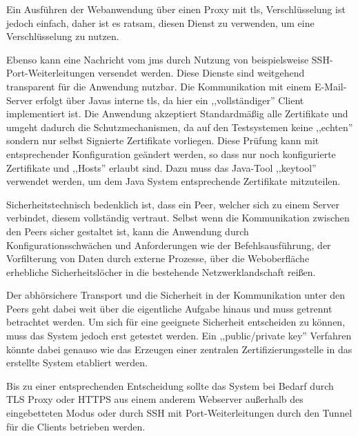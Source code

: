 \documentclass[oneside, ngerman, toc=bibliography,bibliography=totoc,listof=entryprefix, open=right,numbers=noenddot,fontsize=12pt]{scrbook}
\begin{document}
Ein Ausführen der Webanwendung über einen Proxy mit \acrfull{tls}, Verschlüsselung ist jedoch einfach, daher ist es ratsam, diesen Dienst zu verwenden, um eine Verschlüsselung zu nutzen.

Ebenso kann eine Nachricht vom \acrshort{jms} durch Nutzung von beispielsweise SSH-Port-Weiterleitungen versendet werden. Diese Dienste sind weitgehend transparent für die Anwendung nutzbar.
Die Kommunikation mit einem E-Mail-Server erfolgt über Javas interne \acrshort{tls},  da hier ein ,,vollständiger'' Client implementiert ist. Die Anwendung akzeptiert Standardmäßig alle Zertifikate und umgeht dadurch die Schutzmechanismen, da auf den Testsystemen keine ,,echten'' sondern nur selbst Signierte Zertifikate vorliegen.
Diese Prüfung kann mit entsprechender Konfiguration geändert werden, so dass nur noch konfigurierte Zertifikate und ,,Hosts'' erlaubt sind. Dazu muss das Java-Tool ,,keytool'' verwendet werden, um dem Java System entsprechende Zertifikate mitzuteilen.

Sicherheitstechnisch bedenklich ist, dass ein Peer, welcher sich zu einem Server verbindet, diesem vollständig vertraut.
Selbst wenn die Kommunikation zwischen den Peers sicher gestaltet ist, kann die Anwendung durch Konfigurationsschwächen und Anforderungen wie der Befehlsausführung, der Vorfilterung von Daten durch externe Prozesse, über die  Weboberfläche erhebliche Sicherheitslöcher in die bestehende Netzwerklandschaft reißen.

Der abhörsichere Transport und die Sicherheit in der Kommunikation unter den Peers geht dabei weit über die eigentliche Aufgabe hinaus und muss getrennt betrachtet werden. Um sich für eine geeignete Sicherheit entscheiden zu können, muss das System jedoch erst getestet werden. Ein ,,public/private key'' Verfahren könnte dabei genauso wie das Erzeugen einer zentralen Zertifizierungsstelle in das erstellte System etabliert werden.

Bis zu einer entsprechenden Entscheidung sollte das System bei Bedarf durch TLS Proxy oder HTTPS aus einem anderem Webserver außerhalb des eingebetteten Modus  oder durch SSH mit Port-Weiterleitungen durch den Tunnel für die Clients betrieben werden.


 
\end{document}
